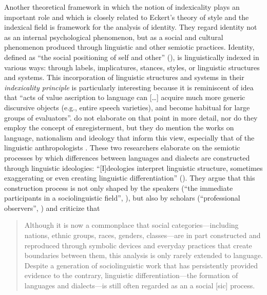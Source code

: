 Another theoretical framework in which the notion of indexicality plays an important role and which is closely related to Eckert’s theory of style and the indexical field is  framework for the analysis of identity. They regard identity not as an internal psychological phenomenon, but as a social and cultural phenomenon produced through linguistic and other semiotic practices. Identity, defined as “the social positioning of self and other” (\citeyear[586]{Bucholtz2005}), is linguistically indexed in various ways: through labels, implicatures, stances, styles, or linguistic structures and systems. This incorporation of linguistic structures and systems in their \textit{indexicality principle} is particularly interesting because it is reminiscent of  idea that “acts of value ascription to language can […] acquire much more generic discursive objects (e.g., entire speech varieties), and become habitual for large groups of evaluators”. \citet[597]{Bucholtz2005} do not elaborate on that point in more detail, nor do they employ the concept of enregisterment, but they do mention the works on language, nationalism and ideology that inform this view, especially that of the linguistic anthropologists \citet{Gal1995}. These two researchers elaborate on the semiotic processes by which differences between languages and dialects are constructed through linguistic ideologies: “[I]deologies interpret linguistic structure, sometimes exaggerating or even creating linguistic differentiation” (\citeyear[993]{Gal1995}). They argue that this construction process is not only shaped by the speakers (“the immediate participants in a sociolinguistic field”, \citeyear[977]{Gal1995}), but also by scholars (“professional observers”, \citeyear[993]{Gal1995}) and criticize that

\begin{quote}
Although it is now a commonplace that social categories—including nations, ethnic groups, races, genders, classes—are in part constructed and reproduced through symbolic devices and everyday practices that create boundaries between them, this analysis is only rarely extended to language. Despite a generation of sociolinguistic work that has persistently provided evidence to the contrary, linguistic differentiation—the formation of languages and dialects—is still often regarded as an a social [sic] process. \citep[969]{Gal1995}
\end{quote}



